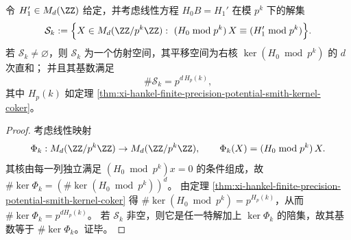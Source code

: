 \begin{corollary}\label{cor:xi-hankel-lifting-branch-count-affine-solution-space}
令 \(H_1'\in M_d(\ZZ)\) 给定，并考虑线性方程 \(H_0B=H_1'\) 在模 \(p^k\) 下的解集
\[
\mathcal S_k:=\Bigl\{X\in M_d(\ZZ/p^k\ZZ):\ (H_0\bmod p^k)\,X\equiv (H_1'\bmod p^k)\Bigr\}.
\]
若 \(\mathcal S_k\neq\varnothing\)，则 \(\mathcal S_k\) 为一个仿射空间，其平移空间为右核 \(\ker(H_0\bmod p^k)\) 的 \(d\) 次直和；
并且其基数满足
\[
\#\mathcal S_k=p^{d\,H_p(k)},
\]
其中 \(H_p(k)\) 如定理 \ref{thm:xi-hankel-finite-precision-potential-smith-kernel-coker}。
\end{corollary}
\begin{proof}
考虑线性映射
\[
\Phi_k:M_d(\ZZ/p^k\ZZ)\to M_d(\ZZ/p^k\ZZ),\qquad
\Phi_k(X)=(H_0\bmod p^k)\,X.
\]
其核由每一列独立满足 \((H_0\bmod p^k)x=0\) 的条件组成，故
\(
\#\ker\Phi_k=(\#\ker(H_0\bmod p^k))^d
\)。
由定理 \ref{thm:xi-hankel-finite-precision-potential-smith-kernel-coker} 得 \(\#\ker(H_0\bmod p^k)=p^{H_p(k)}\)，从而 \(\#\ker\Phi_k=p^{dH_p(k)}\)。
若 \(\mathcal S_k\) 非空，则它是任一特解加上 \(\ker\Phi_k\) 的陪集，故其基数等于 \(\#\ker\Phi_k\)。证毕。
\end{proof}
